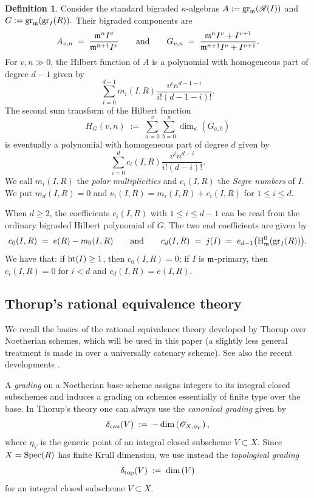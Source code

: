 \documentclass[a4paper, 11pt]{amsart}
\newcommand{\mm}{{\normalfont\mathfrak{m}}}
\newcommand{\HT}{\normalfont\text{ht}}
\newcommand{\Rees}{\mathscr{R}}
\newcommand{\OO}{\mathscr{O}}
\newcommand{\HL}{\normalfont\text{H}_{\mm}}
\newcommand{\gr}{{\normalfont\text{gr}}}
\newcommand{\Spec}{\normalfont\text{Spec}}
\theoremstyle{definition}
\newtheorem{definition}[definition]{Definition}
\begin{document}
	\begin{definition}
		\label{def_polar_segre}
		Consider the standard bigraded $\kappa$-algebras
		$
		A :=\gr_\mm(\Rees(I))
		$
		and
		$
		G := \gr_\mm(\gr_I(R)).
		$
		Their bigraded components are
		$$
		A_{v,n} \;=\; \frac{\mm^nI^v}{\mm^{n+1}I^v} \qquad \text{and} \qquad
		G_{v,n} \;=\; \frac{\mm^nI^v+I^{v+1}}{\mm^{n+1}I^v+I^{v+1}}.
		$$
		For $v,n\gg0$, the Hilbert function of $A$ is a polynomial with homogeneous part of degree $d-1$ given by
		$$
		\sum_{i=0}^{d-1}m_i(I,R)\frac{v^in^{d-1-i}}{i!(d-1-i)!}.
		$$
		The second sum transform of the Hilbert function
		$$
		H_G(v,n) \;:=\; \sum_{a=0}^{v}\sum_{b=0}^{n}\dim_\kappa\left(G_{a,b}\right)
		$$
		is eventually a polynomial with homogeneous part of degree $d$ given by
		$$
		\sum_{i=0}^{d}c_i(I,R)\frac{v^in^{d-i}}{i!(d-i)!}.
		$$
		We call $m_i(I,R)$ the \emph{polar multiplicities} and $c_i(I,R)$ the
		\emph{Segre numbers} of $I$.
		We put $m_d(I,R)=0$ and
		$\nu_i(I,R)=m_i(I,R)+c_i(I,R)$ for $1\leq i\leq d$.
	\end{definition}
	
	When $d\geq2$, the coefficients $c_i(I,R)$ with $1\leq i\leq d-1$ can be read from the ordinary bigraded Hilbert polynomial of $G$.
	The two end coefficients are given by
	$$
	c_0(I,R) \;=\; e(R)-m_0(I,R)  \qquad \text{and} \qquad
	c_d(I,R)\;=\; j(I)
	\;=\; e_{d-1}\bigl(\HL^0(\gr_I(R))\bigr).
	$$
	We have that: if $\HT(I)\geq1$, then $c_0(I,R)=0$;
	if $I$ is $\mm$-primary, then $c_i(I,R)=0$ for $i<d$ and
	$c_d(I,R)=e(I,R)$.
	
	
	\subsection{Thorup's rational equivalence theory}
	\label{subsec:thorup-intersection}
	
	We recall the basics of the rational equivalence theory developed by Thorup \cite{Thorup} over Noetherian schemes, which will be used in this paper (a slightly less general treatment is made in \cite[\href{https://stacks.math.columbia.edu/tag/02QK}{Tag 02QK}]{stacks-project} over a universally catenary scheme).  
	See also the recent developments \cite{CutMon, CutMon2,  Cut26}.
	
	A \emph{grading} on a Noetherian base scheme assigns integers to its integral
	closed subschemes and induces a grading on schemes essentially of finite type over the base.  
	In Thorup's theory \cite{Thorup} one can always use the \emph{canonical grading} given by
	$$
	\delta_{\rm can}(V) \;:=\; -\dim\left(\OO_{X,\eta_V}\right),
	$$
	where $\eta_V$ is the generic point of an integral closed subscheme $V \subset X$.  
	Since $X=\Spec(R)$ has finite Krull dimension, we use instead the \emph{topological
		grading}
	$$
	\delta_{\rm top}(V) \;:=\; \dim\left(V\right)
	$$
	for an integral closed subscheme $V \subset X$.
	
\end{document}
